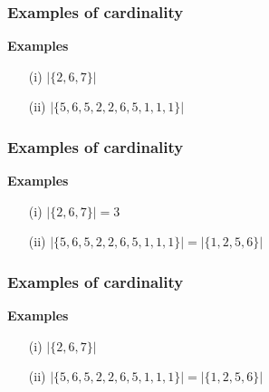 \documentclass{beamer}
\begin{document}
\begin{frame}
\frametitle{Examples of cardinality}
\LARGE
\vspace{-1cm}
\textbf{Examples}
\begin{itemize}
\item[(i)] $|\{2,6,7\}| $
\vspace{2cm}
\item[(ii)] $|\{5,6,5,2,2,6,5,1,1,1\}| $
\end{itemize}
\end{frame}

\begin{frame}
\frametitle{Examples of cardinality}
\LARGE
\vspace{-1cm}
\textbf{Examples}
\begin{itemize}
\item[(i)] $|\{2,6,7\}| = 3 $
\vspace{2cm}
\item[(ii)] $|\{5,6,5,2,2,6,5,1,1,1\}| = |\{1,2,5,6\}| $
\end{itemize}
\end{frame}

\begin{frame}
\frametitle{Examples of cardinality}
\LARGE
\vspace{-1cm}
\textbf{Examples}
\begin{itemize}
\item[(i)] $|\{2,6,7\}| $
\vspace{2cm}
\item[(ii)] $|\{5,6,5,2,2,6,5,1,1,1\}| = |\{1,2,5,6\}| $
\end{itemize}
\end{frame}
\end{document}
